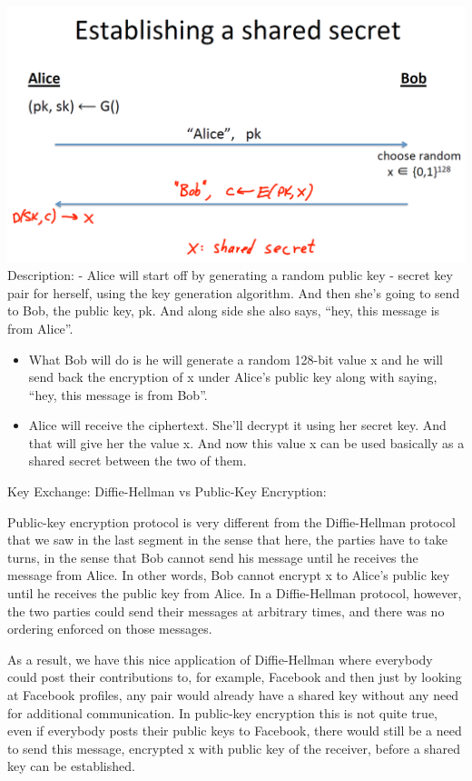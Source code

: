 \documentclass[11pt]{article}
\makeatletter
\def\maxwidth{\ifdim\Gin@nat@width>\linewidth\linewidth
    \else\Gin@nat@width\fi}
\let\Oldincludegraphics\includegraphics
\renewcommand{\includegraphics}[1]{\Oldincludegraphics[width=.8\maxwidth]{#1}}
\makeatother
\begin{document}
\includegraphics{./Images/PKEnc-SecretKeyEstablishment.png} Description:
- Alice will start off by generating a random public key - secret key
pair for herself, using the key generation algorithm. And then she's
going to send to Bob, the public key, pk. And along side she also says,
``hey, this message is from Alice''.

\begin{itemize}
\item
  What Bob will do is he will generate a random 128-bit value x and he
  will send back the encryption of x under Alice's public key along with
  saying, ``hey, this message is from Bob''.
\item
  Alice will receive the ciphertext. She'll decrypt it using her secret
  key. And that will give her the value x. And now this value x can be
  used basically as a shared secret between the two of them.
\end{itemize}

Key Exchange: Diffie-Hellman vs Public-Key Encryption:

Public-key encryption protocol is very different from the Diffie-Hellman
protocol that we saw in the last segment in the sense that here, the
parties have to take turns, in the sense that Bob cannot send his
message until he receives the message from Alice. In other words, Bob
cannot encrypt x to Alice's public key until he receives the public key
from Alice. In a Diffie-Hellman protocol, however, the two parties could
send their messages at arbitrary times, and there was no ordering
enforced on those messages.

As a result, we have this nice application of Diffie-Hellman where
everybody could post their contributions to, for example, Facebook and
then just by looking at Facebook profiles, any pair would already have a
shared key without any need for additional communication. In public-key
encryption this is not quite true, even if everybody posts their public
keys to Facebook, there would still be a need to send this message,
encrypted x with public key of the receiver, before a shared key can be
established.
\end{document}
